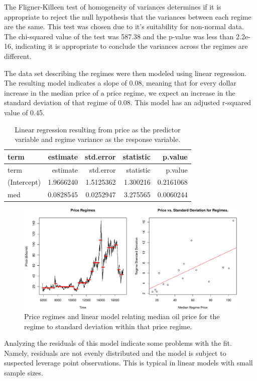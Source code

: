 \documentclass[]{article}
\begin{document}
The Fligner-Killeen test of homogeneity of variances determines if it is
appropriate to reject the null hypothesis that the variances between
each regime are the same. This test was chosen due to it's suitability
for non-normal data. The chi-squared value of the test was 587.38 and
the p-value was less than 2.2e-16, indicating it is appropriate to
conclude the variances across the regimes are different.

The data set describing the regimes were then modeled using linear
regression. The resulting model indicates a slope of 0.08, meaning that
for every dollar increase in the median price of a price regime, we
expect an increase in the standard deviation of that regime of 0.08.
This model has an adjusted r-squared value of 0.45.

\begin{longtable}[]{@{}lrrrr@{}}
\caption{Linear regression resulting from price as the predictor
variable and regime variance as the response variable.}\tabularnewline
\toprule
term & estimate & std.error & statistic & p.value\tabularnewline
\midrule
\endfirsthead
\toprule
term & estimate & std.error & statistic & p.value\tabularnewline
\midrule
\endhead
(Intercept) & 1.9666240 & 1.5125362 & 1.300216 &
0.2161068\tabularnewline
med & 0.0828545 & 0.0252947 & 3.275565 & 0.0060244\tabularnewline
\bottomrule
\end{longtable}

\begin{figure}[htbp]
\centering
\includegraphics{Figs/unnamed-chunk-17-1.pdf}
\caption{Price regimes and linear model relating median oil price for
the regime to standard deviation within that price regime.}
\end{figure}

Analyzing the residuals of this model indicate some problems with the
fit. Namely, residuals are not evenly distributed and the model is
subject to suspected leverage point observations. This is typical in
linear models with small sample sizes.
\end{document}
